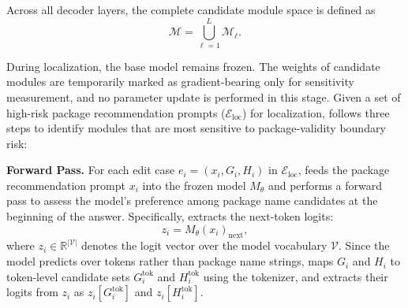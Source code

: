 Across all decoder layers, the complete candidate module space is defined as
\begin{equation}
    \mathcal{M}
    =
    \bigcup_{\ell=1}^{L}
    \mathcal{M}_{\ell}.
\end{equation}

During localization, the base model remains frozen. The weights of candidate modules are temporarily marked as gradient-bearing only for sensitivity measurement, and no parameter update is performed in this stage.
Given a set of high-risk package recommendation prompts ($\mathcal{E}_{\mathrm{loc}}$) for localization, \appname follows three steps to identify modules that are most sensitive to package-validity boundary risk:

\noindent{} \textbf{Forward Pass.}
For each edit case $e_i=(x_i,G_i,H_i)$ in $\mathcal{E}_{\mathrm{loc}}$, \appname feeds the package recommendation prompt $x_i$ into the frozen model $M_{\theta}$ and performs a forward pass to assess the model’s preference among package name candidates at the beginning of the answer. Specifically, \appname extracts the next-token logits:
\begin{equation}
    z_i = M_{\theta}(x_i)_{\mathrm{next}},
\end{equation}
where $z_i \in \mathbb{R}^{|\mathcal{V}|}$ denotes the logit vector over the model vocabulary $\mathcal{V}$.
Since the model predicts over tokens rather than package name strings, \appname maps $G_i$ and $H_i$ to token-level candidate sets $G_i^{\mathrm{tok}}$ and $H_i^{\mathrm{tok}}$ using the tokenizer, and extracts their logits from $z_i$ as $z_i[G_i^{\mathrm{tok}}]$ and $z_i[H_i^{\mathrm{tok}}]$.

